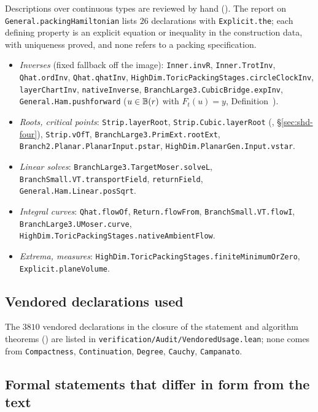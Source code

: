 Descriptions over continuous types are reviewed by hand (). The report on \texttt{General.packingHamiltonian} lists $26$ declarations with \texttt{Explicit.the}; each defining property is an explicit equation or inequality in the construction data, with uniqueness proved, and none refers to a packing specification.
\begin{itemize}
\item \emph{Inverses} (fixed fallback off the image): \texttt{Inner.invR}, \texttt{Inner.TrotInv}, \texttt{Qhat.ordInv}, \texttt{Qhat.qhatInv}, \texttt{HighDim.ToricPackingStages.circleClockInv}, \texttt{layerChartInv}, \texttt{nativeInverse}, \texttt{BranchLarge3.CubicBridge.expInv}, \texttt{General.Ham.pushforward} ($u\in\mathbb{B}(r)$ with $F_t(u)=y$, Definition~).
\item \emph{Roots, critical points}: \texttt{Strip.layerRoot}, \texttt{Strip.Cubic.layerRoot} (\cite{SongHD}, \S\ref{sec:shd-four}), \texttt{Strip.vOfT}, \texttt{BranchLarge3.PrimExt.rootExt}, \texttt{Branch2.Planar.PlanarInput.pstar}, \texttt{HighDim.PlanarGen.Input.vstar}.
\item \emph{Linear solves}: \texttt{BranchLarge3.TargetMoser.solveL}, \texttt{BranchSmall.VT.transportField}, \texttt{returnField}, \texttt{General.Ham.Linear.posSqrt}.
\item \emph{Integral curves}: \texttt{Qhat.flowOf}, \texttt{Return.flowFrom}, \texttt{BranchSmall.VT.flowI}, \texttt{BranchLarge3.UMoser.curve}, \texttt{HighDim.ToricPackingStages.nativeAmbientFlow}.
\item \emph{Extrema, measures}: \texttt{HighDim.ToricPackingStages.finiteMinimumOrZero}, \texttt{Explicit.planeVolume}.
\end{itemize}

\subsection{Vendored declarations used}\label{sec:xpl-vendored}

The $3810$ vendored declarations in the closure of the statement and algorithm theorems () are listed in \texttt{verification/Audit/VendoredUsage.lean}; none comes from \texttt{Compactness}, \texttt{Continuation}, \texttt{Degree}, \texttt{Cauchy}, \texttt{Campanato}.

\endgroup

\subsection{Formal statements that differ in form from the text}\label{sec:xpl-interface}

